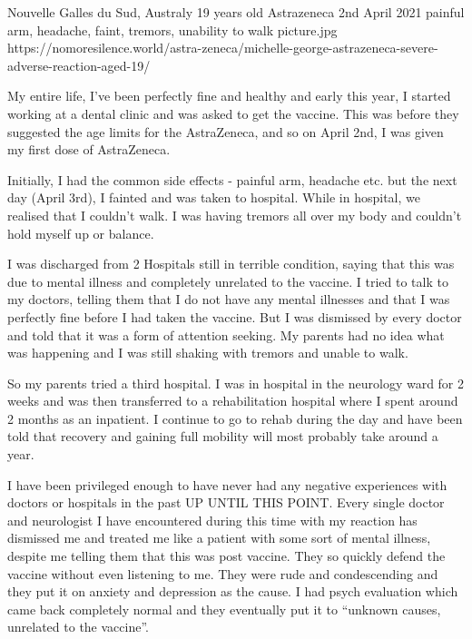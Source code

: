           {Nouvelle Galles du Sud, Australy}
          {19 years old}
          {Astrazeneca}
          {2nd April 2021}
          {painful arm, headache, faint, tremors, unability to walk}
          {picture.jpg}
          {https://nomoresilence.world/astra-zeneca/michelle-george-astrazeneca-severe-adverse-reaction-aged-19/}
          {

My entire life, I’ve been perfectly fine and healthy and early this year, I
started working at a dental clinic and was asked to get the vaccine. This was
before they suggested the age limits for the AstraZeneca, and so on April 2nd, I
was given my first dose of AstraZeneca.

Initially, I had the common side effects - painful arm, headache etc. but the
next day (April 3rd), I fainted and was taken to hospital. While in hospital, we
realised that I couldn’t walk. I was having tremors all over my body and
couldn’t hold myself up or balance.

I was discharged from 2 Hospitals still in terrible condition, saying that this
was due to mental illness and completely unrelated to the vaccine. I tried to
talk to my doctors, telling them that I do not have any mental illnesses and
that I was perfectly fine before I had taken the vaccine. But I was dismissed by
every doctor and told that it was a form of attention seeking. My parents had no
idea what was happening and I was still shaking with tremors and unable to
walk.

So my parents tried a third hospital. I was in hospital in the neurology ward
for 2 weeks and was then transferred to a rehabilitation hospital where I spent
around 2 months as an inpatient. I continue to go to rehab during the day and
have been told that recovery and gaining full mobility will most probably take
around a year.

I have been privileged enough to have never had any negative experiences with
doctors or hospitals in the past UP UNTIL THIS POINT. Every single doctor and
neurologist I have encountered during this time with my reaction has dismissed
me and treated me like a patient with some sort of mental illness, despite me
telling them that this was post vaccine. They so quickly defend the vaccine
without even listening to me. They were rude and condescending and they put it
on anxiety and depression as the cause. I had psych evaluation which came back
completely normal and they eventually put it to “unknown causes, unrelated to
the vaccine”.

}

